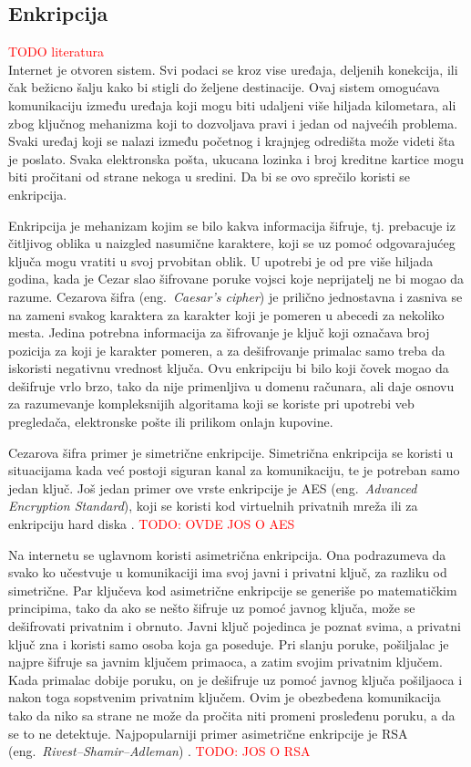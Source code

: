\documentclass[a4paper]{article}
\newcommand\todos[1]{\textcolor{red}{#1}}
\begin{document}
\subsection{Enkripcija} 
\todos{TODO literatura} \\
Internet je otvoren sistem. Svi podaci se kroz vise uređaja, deljenih konekcija, ili čak bežicno šalju kako bi stigli do željene destinacije. Ovaj sistem omogućava komunikaciju između uređaja koji mogu biti udaljeni više hiljada kilometara, ali zbog ključnog mehanizma koji to dozvoljava pravi i jedan od najvećih problema. Svaki uređaj koji se nalazi između početnog i krajnjeg  odredišta može videti šta je poslato. Svaka elektronska pošta, ukucana lozinka i broj kreditne kartice mogu biti pročitani od strane nekoga u sredini. Da bi se ovo sprečilo koristi se enkripcija.
\par Enkripcija je mehanizam kojim se bilo kakva informacija šifruje, tj. prebacuje iz čitljivog oblika u naizgled nasumične karaktere, koji se uz pomoć odgovarajućeg ključa mogu vratiti u svoj prvobitan oblik. U upotrebi je od pre više hiljada godina, kada je Cezar slao šifrovane poruke vojsci koje neprijatelj ne bi mogao da razume. Cezarova šifra (eng.~{\em Caesar's cipher}) je prilično jednostavna i zasniva se na zameni svakog karaktera za karakter koji je pomeren u abecedi za nekoliko mesta. Jedina potrebna informacija za šifrovanje je ključ koji označava broj pozicija za koji je karakter pomeren, a za dešifrovanje primalac samo treba da iskoristi negativnu vrednost ključa. Ovu enkripciju bi bilo koji čovek mogao da dešifruje vrlo brzo, tako da nije primenljiva u domenu računara, ali daje osnovu za razumevanje kompleksnijih algoritama koji se koriste pri upotrebi veb pregledača, elektronske pošte ili prilikom onlajn kupovine.
\par Cezarova šifra primer je simetrične enkripcije. Simetrična enkripcija se koristi u situacijama kada već postoji siguran kanal za komunikaciju, te je potreban samo jedan ključ. Još jedan primer ove vrste enkripcije je AES (eng.~{\em Advanced Encryption Standard}), koji se koristi kod virtuelnih privatnih mreža ili za enkripciju hard diska \cite{aes}. \todos{TODO: OVDE JOS O AES}
\par Na internetu se uglavnom koristi asimetrična enkripcija. Ona podrazumeva da svako ko učestvuje u komunikaciji ima svoj javni i privatni ključ, za razliku od simetrične. Par ključeva kod asimetrične enkripcije se generiše po matematičkim principima, tako da ako se nešto šifruje uz pomoć javnog ključa, može se dešifrovati privatnim i obrnuto. Javni ključ pojedinca je poznat svima, a privatni ključ zna i koristi samo osoba koja ga poseduje. Pri slanju poruke, pošiljalac je najpre šifruje sa javnim ključem primaoca, a zatim svojim privatnim ključem. Kada primalac dobije poruku, on je dešifruje uz pomoć javnog ključa pošiljaoca i nakon toga sopstvenim privatnim ključem. Ovim je obezbeđena komunikacija tako da niko sa strane ne može da pročita niti promeni prosleđenu poruku, a da se to ne detektuje. Najpopularniji primer asimetrične enkripcije je RSA (eng.~{\em Rivest–Shamir–Adleman}) \cite{rsa}. \todos{TODO: JOS O RSA} 
\end{document}
